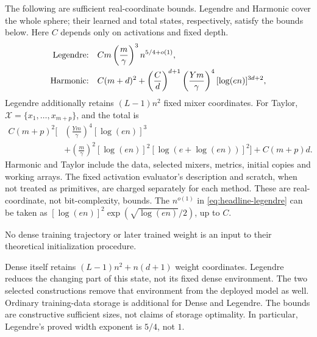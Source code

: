 \begin{theorem}
The following are sufficient real-coordinate bounds. Legendre and Harmonic
cover the whole sphere; their learned and total states, respectively, satisfy
the bounds below. Here $C$ depends only on activations and fixed depth.
\begin{align}
 \text{\rm Legendre:}\quad
 &Cm\left(\frac m\gamma\right)^3n^{5/4+o(1)},
 \label{eq:headline-legendre}\\
 \text{\rm Harmonic:}\quad
 &C(m+d)^2+
 \left(\frac Cd\right)^{d+1}
 \left(\frac{Ym}{\gamma}\right)^4[\log(en)]^{3d+2},
 \label{eq:headline-harmonic}
\end{align}
Legendre additionally retains $(L-1)n^2$ fixed mixer coordinates.
For Taylor, $\mathcal X=\{x_1,\ldots,x_{m+p}\}$, and the total is
\begin{equation}
\begin{split}
 C(m+p)^2\bigg[
 &\left(\frac{Ym}{\gamma}\right)^4[\log(en)]^3\\
 &+\left(\frac m\gamma\right)^2[\log(en)]^2
                  [\log(e+\log(en))]^2\bigg]+C(m+p)d.
\end{split}
\label{eq:headline-panel}
\end{equation}
Harmonic and Taylor include the data, selected mixers, metrics,
initial copies and working arrays. The fixed activation evaluator's
description and scratch, when not treated as primitives, are charged
separately for each method.
These are real-coordinate, not bit-complexity, bounds.
The $n^{o(1)}$ in \eqref{eq:headline-legendre} can be taken as
$[\log(en)]^2\exp(\sqrt{\log(en)}/2)$, up to $C$.

No dense training trajectory or later
trained weight is an input to their theoretical initialization procedure.
\end{theorem}

Dense itself retains $(L-1)n^2+n(d+1)$ weight coordinates.
Legendre reduces the changing part of this state, not its fixed dense
environment. The two selected constructions remove that environment from
the deployed model as well. Ordinary training-data storage is additional
for Dense and Legendre. The bounds are constructive sufficient sizes,
not claims of storage optimality. In particular, Legendre's proved width
exponent is $5/4$, not $1$.


